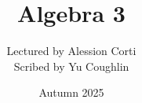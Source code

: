 \documentclass{article}
\begin{document}
\title{Algebra 3}
\author{Lectured by Alession Corti \\
Scribed by Yu Coughlin}
\date{Autumn 2025}

\maketitle

\tableofcontents
\end{document}
